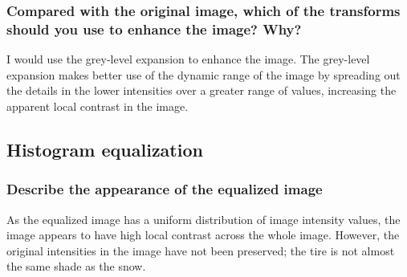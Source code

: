 \documentclass[article, 1.5space, letterpaper, 12pt, oneside, header, footer]{SydeClass}
\begin{document}
\subsubsection{Compared with the original image, which of the transforms should you use to enhance the image? Why?}

I would use the grey-level expansion to enhance the image. The grey-level expansion makes better use of the dynamic range of the image by spreading out the details in the lower intensities over a greater range of values, increasing the apparent local contrast in the image.

\subsection{Histogram equalization}


\begin{figure}[ht]
\centering
\end{figure}

\subsubsection{Describe the appearance of the equalized image}

As the equalized image has a uniform distribution of image intensity values, the image appears to have high local contrast across the whole image. However, the original intensities in the image have not been preserved; the tire is not almost the same shade as the snow.
\end{document}
